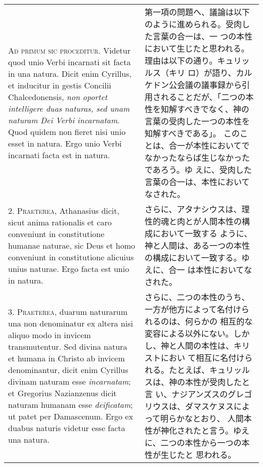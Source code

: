 \documentclass[10pt]{jsarticle} %
\begin{document}
\begin{longtable}{p{21em}p{21em}}

{\Huge A}{\scshape d primum sic proceditur}. Videtur quod unio Verbi
incarnati sit facta in una natura. Dicit enim Cyrillus, et inducitur
in gestis Concilii Chalcedonensis, {\itshape non oportet intelligere
duas naturas, sed unam naturam Dei Verbi incarnatam}. Quod quidem non
fieret nisi unio esset in natura. Ergo unio Verbi incarnati facta est
in natura.


&

第一項の問題へ、議論は以下のように進められる。受肉した言葉の合一は、一
つの本性において生じたと思われる。理由は以下の通り。キュリッルス（キリ
ロ）が語り、カルケドン公会議の議事録から引用されることだが、「二つの本
性を知解すべきでなく、神の言葉の受肉した一つの本性を知解すべきである」。
このことは、合一が本性においてでなかったならば生じなかったであろう。ゆ
えに、受肉した言葉の合一は、本性においてなされた。



\\



2. {\scshape Praeterea}, Athanasius dicit, sicut anima rationalis et
caro conveniunt in constitutione humanae naturae, sic Deus et homo
conveniunt in constitutione alicuius unius naturae. Ergo facta est
unio in natura.


&


さらに、アタナシウスは、理性的魂と肉とが人間本性の構成において一致する
ように、神と人間は、ある一つの本性の構成において一致する。ゆえに、合一
は本性においてなされた。

\\



3. {\scshape Praeterea}, duarum naturarum una non denominatur ex
altera nisi aliquo modo in invicem transmutentur. Sed divina natura et
humana in Christo ab invicem denominantur, dicit enim Cyrillus divinam
naturam esse {\itshape incarnatam}; et Gregorius Nazianzenus dicit
naturam humanam esse {\itshape deificatam}; ut patet per
Damascenum. Ergo ex duabus naturis videtur esse facta una natura.


&

さらに、二つの本性のうち、一方が他方によって名付けられるのは、何らかの
相互的な変容による以外にない。しかし、神と人間の本性は、キリストにおい
て相互に名付けられる。たとえば、キュリッルスは、神の本性が受肉したと言
い、ナジアンズスのグレゴリウスは、ダマスケヌスによって明らかなとおり、
人間本性が神化されたと言う。ゆえに、二つの本性から一つの本性が生じたと
思われる。



\end{longtable}
\end{document}
